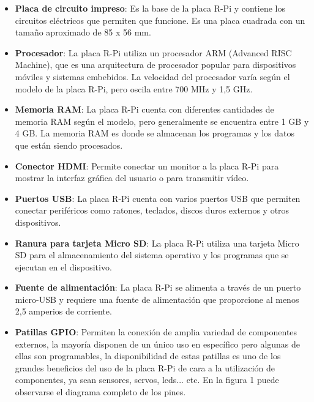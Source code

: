 \begin{itemize}
\item \textbf{Placa de circuito impreso}: Es la base de la placa R-Pi y contiene los circuitos eléctricos que permiten que funcione. Es una placa cuadrada con un tamaño aproximado de 85 x 56 mm.

\item \textbf{Procesador}: La placa R-Pi utiliza un procesador ARM (Advanced RISC Machine), que es una arquitectura de procesador popular para dispositivos móviles y sistemas embebidos. La velocidad del procesador varía según el modelo de la placa R-Pi, pero oscila entre 700 MHz y 1,5 GHz.

\item \textbf{Memoria RAM}: La placa R-Pi cuenta con diferentes cantidades de memoria RAM según el modelo, pero generalmente se encuentra entre 1 GB y 4 GB. La memoria RAM es donde se almacenan los programas y los datos que están siendo procesados.

\item \textbf{Conector HDMI}: Permite conectar un monitor a la placa R-Pi para mostrar la interfaz gráfica del usuario o para transmitir vídeo.

\item \textbf{Puertos USB}: La placa R-Pi cuenta con varios puertos USB que permiten conectar periféricos como ratones, teclados, discos duros externos y otros dispositivos.

\item \textbf{Ranura para tarjeta Micro SD}: La placa R-Pi utiliza una tarjeta Micro SD para el almacenamiento del sistema operativo y los programas que se ejecutan en el dispositivo.

\item \textbf{Fuente de alimentación}: La placa R-Pi se alimenta a través de un puerto micro-USB y requiere una fuente de alimentación que proporcione al menos 2,5 amperios de corriente.
\item \textbf{Patillas GPIO}: Permiten la conexión de amplia variedad de componentes externos, la mayoría disponen de un único uso en específico pero algunas de ellas son programables, la disponibilidad de estas patillas es uno de los grandes beneficios del uso de la placa R-Pi  de cara a la utilización de componentes, ya sean sensores, servos, leds... etc. En la figura 1 puede observarse el diagrama completo de los pines.

\end{itemize}


